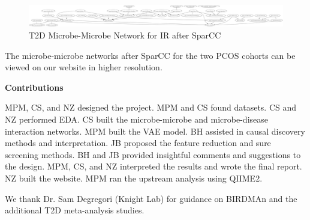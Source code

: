 \documentclass[12pt,letterpaper]{article}
\begin{document}
\begin{figure}[h!]
  \centering
  \includegraphics[width=\linewidth]{../graphs/t2d/sparcc_IR_norm.png}
  \caption{T2D Microbe-Microbe Network for IR after SparCC}
  \label{fig:t2dsparccIRnorm}
\end{figure}

The microbe-microbe networks after SparCC for the two PCOS cohorts can be viewed on our website in higher resolution.

\clearpage
\textbf{Contributions}

MPM, CS, and NZ designed the project. MPM and CS found datasets. CS and NZ performed EDA. CS built the microbe-microbe and microbe-disease interaction networks. MPM built the VAE model. BH assisted in causal discovery methods and interpretation. JB proposed the feature reduction and sure screening methods. BH and JB provided insightful comments and suggestions to the design. MPM, CS, and NZ interpreted the results and wrote the final report. NZ built the website. MPM ran the upstream analysis using QIIME2. 

We thank Dr. Sam Degregori (Knight Lab) for guidance on BIRDMAn and the additional T2D meta-analysis studies. 
\end{document}

